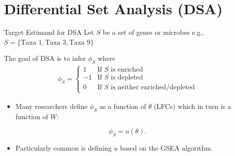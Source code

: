 \documentclass{beamer}
\begin{document}
\section{Differential Set Analysis (DSA)}
\label{sec:org1ac33bd}
\begin{frame}[label={sec:orgc1038f9}]{Target Estimand for DSA}
Let \(S\)  be a set of genes or microbes e.g., \(S=\{\text{Taxa 1}, \text{Taxa 3}, \text{Taxa 9}\}\)


\vspace{15px}

The goal of DSA is to infer \(\phi_S\) where
\begin{align*}
  \phi_S = \begin{cases}
    1 & \text{If } S \text{ is enriched} \\
    -1 & \text{If } S \text{ is depleted} \\
    0 & \text{If } S \text{ is neither enriched/depleted}
  \end{cases}
\end{align*}

\vspace{15px}
\pause
\begin{itemize}
\item Many researchers define \(\phi_{S}\) as a function of \(\theta\) (LFCs) which in turn is a function of \(W\):
\end{itemize}
\[\phi_{S}=u(\theta).\]

\begin{itemize}
\item Particularly common is defining \(u\) based on the GSEA algorithm.
\end{itemize}
\end{frame}
\end{document}
